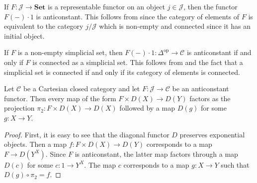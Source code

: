 \documentclass[reqno]{amsart}
\theoremstyle{definition}
\theoremstyle{remark}
\newcommand{\fs}[1]{\mathrm{#1}}
\newcommand{\cat}[1]{\mathbf{#1}}
\newcommand{\scat}[1]{\mathcal{#1}}
\newcommand{\Set}{\cat{Set}}
\numberwithin{figure}{section}
\begin{document}
\begin{example}
If $F : \scat{J} \to \Set$ is a representable functor on an object $j \in \scat{J}$, then the functor $F(-) \cdot 1$ is anticonstant.
This follows from  since the category of elements of $F$ is equivalent to the category $j/\scat{J}$ which is non-empty and connected since it has an initial object.
\end{example}

\begin{example}
If $F$ is a non-empty simplicial set, then $F(-) \cdot 1 : \Delta^\fs{op} \to \scat{C}$ is anticonstant if and only if $F$ is connected as a simplicial set.
This follows from  and the fact that a simplicial set is connected if and only if its category of elements is connected.
\end{example}

\begin{lem}
Let $\scat{C}$ be a Cartesian closed category and let $F : \scat{J} \to \scat{C}$ be an anticonstant functor.
Then every map of the form $F \times D(X) \to D(Y)$ factors as the projection $\pi_2 : F \times D(X) \to D(X)$ followed by a map $D(g)$ for some $g : X \to Y$.
\end{lem}
\begin{proof}
First, it is easy to see that the diagonal functor $D$ preserves exponential objects.
Then a map $f : F \times D(X) \to D(Y)$ corresponds to a map $F \to D(Y^X)$.
Since $F$ is anticonstant, the latter map factors through a map $D(c)$ for some $c : 1 \to Y^X$.
The map $c$ corresponds to a map $g : X \to Y$ such that $D(g) \circ \pi_2 = f$.
\end{proof}
\end{document}
